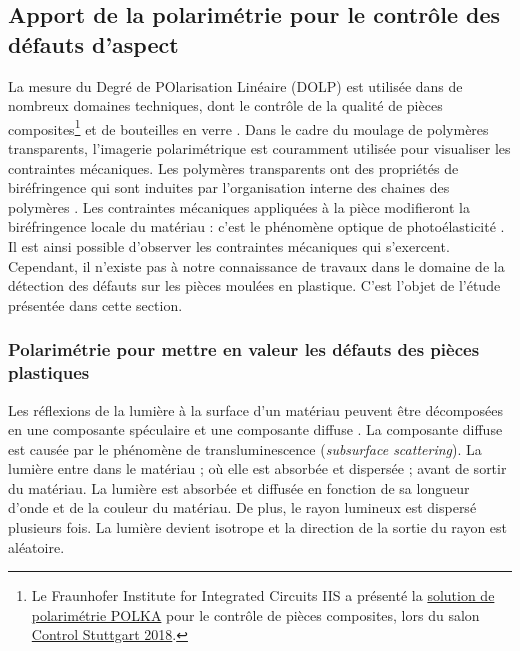 
\subsection{Apport de la polarimétrie pour le contrôle des défauts d'aspect} \label{subsec:polarimetry}
La mesure du Degré de POlarisation Linéaire (DOLP) est utilisée dans de nombreux domaines techniques, dont le contrôle de la qualité de pièces composites\footnote{Le Fraunhofer Institute for Integrated Circuits IIS a présenté la \href{https://www.iis.fraunhofer.de/en/ff/sse/ims/tech/polarisationskamera.html}{solution de polarimétrie POLKA} pour le contrôle de pièces composites, lors du salon \href{https://www.control-messe.de/en/}{Control Stuttgart 2018}.} et de bouteilles en verre \cite{atkinson_highsensitivity_2018}.
Dans le cadre du moulage de polymères transparents, l'imagerie polarimétrique est couramment utilisée pour visualiser les contraintes mécaniques.
Les polymères transparents ont des propriétés de biréfringence qui sont induites par l'organisation interne des chaines des polymères \cite{denizart_thermal_1995}.
Les contraintes mécaniques appliquées à la pièce modifieront la biréfringence locale du matériau : c'est le phénomène optique de photoélasticité \cite{brewster_experiments_1833}.
Il est ainsi possible d'observer les contraintes mécaniques qui s'exercent.
Cependant, il n'existe pas à notre connaissance de travaux dans le domaine de la détection des défauts sur les pièces moulées en plastique.
C'est l'objet de l'étude présentée dans cette section.

\subsubsection{Polarimétrie pour mettre en valeur les défauts des pièces plastiques}
Les réflexions de la lumière à la surface d'un matériau peuvent être décomposées en une composante spéculaire et une composante diffuse \cite{hanrahan_reflection_1993}.
La composante diffuse est causée par le phénomène de transluminescence (\textit{subsurface scattering}).
La lumière entre dans le matériau ; où elle est absorbée et dispersée ; avant de sortir du matériau.
La lumière est absorbée et diffusée en fonction de sa longueur d'onde et de la couleur du matériau.
De plus, le rayon lumineux est dispersé plusieurs fois.
La lumière devient isotrope et la direction de la sortie du rayon est aléatoire.

